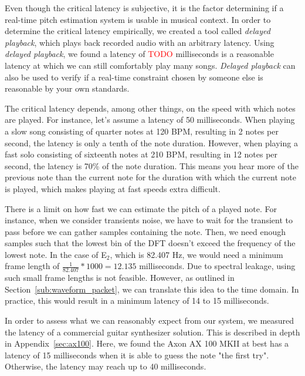 \documentclass[a4paper,10pt,twocolumn]{article}
\newcommand{\note}[2]{#1${}_{#2}$}
\begin{document}
Even though the critical latency is subjective, it is the factor determining if a real-time pitch estimation system is usable in musical context. In order to determine the critical latency empirically, we created a tool called \textit{delayed playback}, which plays back recorded audio with an arbitrary latency. Using \textit{delayed playback}, we found a latency of \textcolor{red}{TODO} milliseconds is a reasonable latency at which we can still comfortably play many songs. \textit{Delayed playback} can also be used to verify if a real-time constraint chosen by someone else is reasonable by your own standards.%

The critical latency depends, among other things, on the speed with which notes are played. For instance, let's assume a latency of 50 milliseconds. When playing a slow song consisting of quarter notes at 120 BPM, resulting in 2 notes per second, the latency is only a tenth of the note duration. However, when playing a fast solo consisting of sixteenth notes at 210 BPM, resulting in 12 notes per second, the latency is 70\% of the note duration. This means you hear more of the previous note than the current note for the duration with which the current note is played, which makes playing at fast speeds extra difficult. %

There is a limit on how fast we can estimate the pitch of a played note. For instance, when we consider transients noise, we have to wait for the transient to pass before we can gather samples containing the note. Then, we need enough samples such that the lowest bin of the DFT doesn't exceed the frequency of the lowest note. In the case of \note{E}{2}, which is 82.407 Hz, we would need a minimum frame length of $ \frac{1}{82.407} * 1000 = 12.135 $ milliseconds. Due to spectral leakage, using such small frame lengths is not feasible. However, as outlined in Section~\ref{sub:waveform_packet}, we can translate this idea to the time domain. In practice, this would result in a minimum latency of 14 to 15 milliseconds.

In order to assess what we can reasonably expect from our system, we measured the latency of a commercial guitar synthesizer solution. This is described in depth in Appendix~\ref{sec:ax100}. Here, we found the Axon AX 100 MKII at best has a latency of 15 milliseconds when it is able to guess the note "the first try". Otherwise, the latency may reach up to 40 milliseconds.
\end{document}
